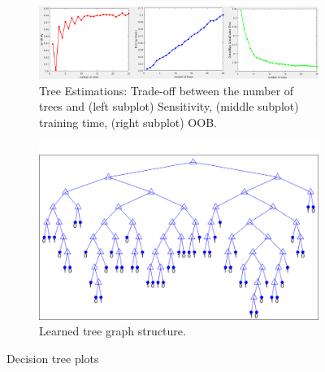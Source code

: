 \begin{figure}[t]
	\centering
	\begin{subfigure}{.7\textwidth}
		\centering
		\includegraphics[width=.95\textwidth]{figures/tree_graph.png}
		\caption{Tree Estimations: Trade-off between the number of 
		trees 
			and (left subplot) Sensitivity, (middle subplot) training 
			time, 
			(right subplot) OOB.}
		\label{fig:tree_graph}
	\end{subfigure}%
	\begin{subfigure}{.35\textwidth}
	\centering
	\includegraphics[width=.9\textwidth]{figures/tree.png}
	\caption{Learned tree graph structure.}
	\label{fig:tree}
	\end{subfigure}
	\caption{Decision tree plots}
	\label{fig:t}
\end{figure}

